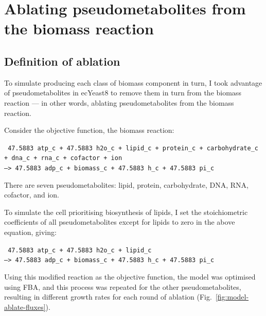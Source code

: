 \section{Ablating pseudometabolites from the biomass reaction}
\label{sec:model-yeast8-pseudometabolites}

\subsection{Definition of ablation}
\label{sec:model-yeast8-pseudometabolites-def}

To simulate producing each class of biomass component in turn,
I took advantage of pseudometabolites in ecYeast8 to remove them in turn from the biomass reaction ---
in other words, ablating pseudometabolites from the biomass reaction.

Consider the objective function, the biomass reaction:

\texttt{
  47.5883 atp\_c + 47.5883 h2o\_c + lipid\_c + protein\_c + carbohydrate\_c\\
  + dna\_c + rna\_c + cofactor + ion \\
  --> 47.5883 adp\_c + biomass\_c + 47.5883 h\_c + 47.5883 pi\_c
}

There are seven pseudometabolites: lipid, protein, carbohydrate, DNA, RNA, cofactor, and ion.

To simulate the cell prioritising biosynthesis of lipids, I set the stoichiometric coefficients of all pseudometabolites except for lipids to zero in the above equation, giving:

\texttt{
  47.5883 atp\_c + 47.5883 h2o\_c + lipid\_c \\
  --> 47.5883 adp\_c + biomass\_c + 47.5883 h\_c + 47.5883 pi\_c
}

Using this modified reaction as the objective function, the model was optimised using FBA, and
this process was repeated for the other pseudometabolites, resulting in different growth rates for each round of ablation (Fig.\ \ref{fig:model-ablate-fluxes}).

